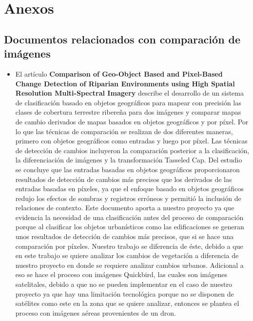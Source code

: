 \newpage
\section{Anexos}
\subsection{Documentos relacionados con comparación de imágenes}
    \begin{itemize}
    \item El artículo \textbf{Comparison of Geo-Object Based and Pixel-Based Change Detection of Riparian Environments using High Spatial Resolution Multi-Spectral Imagery}  \cite{article23} describe el desarrollo de un sistema de clasificación basado en objetos geográficos para mapear con precisión las clases de cobertura terrestre ribereña para dos imágenes y comparar mapas de cambio derivados de mapas basados en objetos geográficos y por píxel.  Por lo que las técnicas de comparación se realizan de dos diferentes maneras, primero con objetos geográficos como entradas y luego por píxel. Las técnicas de detección de cambios incluyeron la comparación posterior a la clasificación, la diferenciación de imágenes y la transformación Tasseled Cap. Del estudio se concluye que las entradas basadas en objetos geográficos proporcionaron resultados de detección de cambios más precisos que los derivados de las entradas basadas en píxeles, ya que el enfoque basado en objetos geográficos redujo los efectos de sombras y registros erróneos y permitió la inclusión de relaciones de contexto.
    Este documento aporta a nuestro proyecto ya que evidencia la necesidad de una clasificación antes del proceso de comparación porque al clasificar los objetos urbanísticos como las edificaciones se generan unos resultados de detección de cambios más precisos, que si se hace una comparación por píxeles.
    Nuestro trabajo se diferencia de éste, debido a que en este trabajo se quiere analizar los cambios de vegetación a diferencia de nuestro proyecto en donde se requiere analizar cambios urbanos. Adicional a eso se hace el proceso con imágenes Quickbird, las cuales son imágenes satelitales, debido a que no se pueden implementar en el caso de nuestro proyecto ya que hay una limitación tecnológica porque no se disponen de satélites como este en la zona que se quiere analizar, entonces se plantea el proceso con imágenes aéreas provenientes de un dron.
    

\end{itemize}
